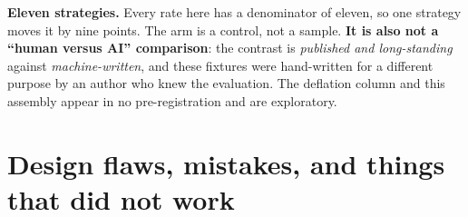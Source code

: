 \documentclass[11pt,a4paper]{article}
\begin{document}
\begin{scopebox}
\textbf{Eleven strategies.} Every rate here has a denominator of eleven, so one strategy moves it
by nine points. The arm is a control, not a sample. \textbf{It is also not a ``human versus AI''
comparison}: the contrast is \emph{published and long-standing} against \emph{machine-written}, and
these fixtures were hand-written for a different purpose by an author who knew the evaluation.
The deflation column and this assembly appear in no pre-registration and are exploratory.
\end{scopebox}

\section{Design flaws, mistakes, and things that did not work}
\label{sec:flaws}
\end{document}
